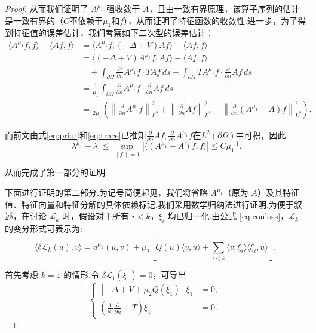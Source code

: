 \begin{proof}
从而我们证明了 $A^{\mu_{1}}$ 强收敛于 $A$，且由一致有界原理，该算子序列的估计是一致有界的（$C$不依赖于$\mu_{1}$和$f$），从而证明了特征函数的收敛性.进一步，为了得到特征值的误差估计，我们考察如下二次型的误差估计：
\begin{equation*}
\begin{aligned}
\langle A^{\mu_{1}}f, f\rangle - \langle Af, f\rangle &= \langle A^{\mu_{1}}f, (-\Delta+V) Af\rangle - \langle Af, f\rangle \\
&= \langle (-\Delta+V)A^{\mu_{1}}f, Af\rangle - \langle Af, f\rangle \\
&\quad + \int_{\partial \Omega} \frac{\partial}{\partial n} A^{\mu_{1}}f \cdot T Af \, ds - \int_{\partial \Omega} T A^{\mu_{1}}f \cdot \frac{\partial}{\partial n} Af \, ds \\
&= \frac{1}{\mu_{1}}\int_{\partial \Omega} \frac{\partial }{\partial n}A^{\mu_{1}}f \cdot \frac{\partial }{\partial n}Af \, ds \\
&= \frac{1}{2\mu_{1}}\left(
\left\|\frac{\partial}{\partial n}A^{\mu_{1}}f\right\|_{L^{2}}^{2} + \left\|\frac{\partial}{\partial n}Af\right\|_{L^{2}}^{2} - \left\|\frac{\partial}{\partial n}(A^{\mu_{1}}-A)f\right\|_{L^{2}}^{2}
\right).
\end{aligned}
\end{equation*}

而前文由式\eqref{eq:prior}和\eqref{eq:trace}已推知$\frac{\partial }{\partial n}Af, \frac{\partial }{\partial n}A^{\mu_{1}}f$在$L^2(\partial\Omega)$中可积，因此
\begin{equation*}
|\lambda^{\mu_1} - \lambda| \le \sup_{\|f\|=1} | \langle (A^{\mu_1} - A)f, f \rangle |\le C\mu_{1}^{-1}.
\end{equation*}

从而完成了第一部分的证明.

下面进行证明的第二部分.为记号简便起见，我们将省略 $A^{\mu_1}$（原为 $A$）及其特征值、特征向量和特征分解的具体依赖标记.我们采用数学归纳法进行证明.为便于叙述，在讨论 $\mathcal{L}_k$ 时，假设对于所有 $i<k$，$\xi_i$ 均已归一化.由公式 \eqref{eq:conloss}，$\mathcal{L}_{k}$ 的变分形式可表示为:
\begin{equation*}
\langle\delta \mathcal{L}_{k}(u),v\rangle=a^{\mu_1}(u,v)+\mu_2\left[Q(u) \langle v, u\rangle+ \sum\limits_{i<k}\langle v,\xi_{i} \rangle\langle \xi_{i},u \rangle\right].
\end{equation*}

首先考虑 $k = 1$ 的情形.令 $\delta \mathcal{L}_{1}(\xi_1)=0$，可导出 
\begin{equation}\label{eq:3.16}
\left\{
\begin{aligned}
\left[-\Delta+V+\mu_2Q(\xi_{1})\right]\xi_{1}&=0,\\
\left(\frac{1}{\mu_1}\frac{\partial}{\partial n}+T\right)\xi_{1}&=0.
\end{aligned}
\right.
\end{equation}


\end{proof}
